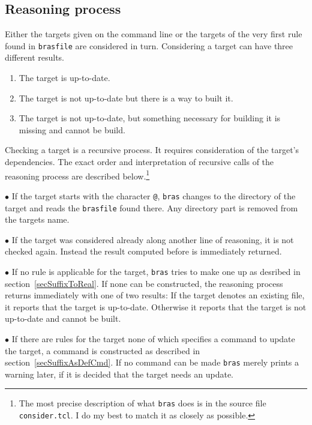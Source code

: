 \documentclass[11pt]{scrartcl}
\makeatletter
\newcommand{\bras}{\texttt{bras}}
\newcommand{\Indextt}[1]{\texttt{#1}\index{#1@\texttt{#1}}}
\makeatother
\begin{document}
\subsection{Reasoning process}
\label{secReasoning}
Either the targets given on the command line or the targets of the
very first rule found in \texttt{brasfile} are considered in
turn. Considering a target can have three different results. 
\begin{enumerate}
\item
The target is up-to-date.
\item
The target is not up-to-date but there is a way to built it.
\item
The target is not up-to-date, but something necessary for building it
is missing and cannot be build.
\end{enumerate}
Checking a target is a recursive process. It requires consideration of
the target's dependencies. The exact order and interpretation of
recursive calls of the reasoning process are described
below.\footnote{The most precise description of what \bras{} does is
  in the source file \Indextt{consider.tcl}. I do my best to match it
  as closely as possible.}

$\bullet$ If the target starts with the character \Indextt{@}, \bras{}
changes to the directory of the target and reads the \texttt{brasfile}
found there. Any directory part is removed from the targets name.

$\bullet$ If the target was considered already along another line of
reasoning, it is not checked again. Instead the result computed before
is immediately returned.

$\bullet$ If no rule is applicable for the target, \bras{} tries to
make one up as desribed in section~\ref{secSuffixToReal}. If none can be
constructed, the reasoning process returns immediately with one of two
results: If the target denotes an existing file, it reports that the
target is up-to-date. Otherwise it reports that the target is not
up-to-date and cannot be built.

$\bullet$ If there are rules for the target none of which specifies a
command to update the target, a command is constructed as described in
section~\ref{secSuffixAsDefCmd}. If no command can be made \bras{}
merely prints a warning later, if it is decided that the target needs
an update.

\end{document}
